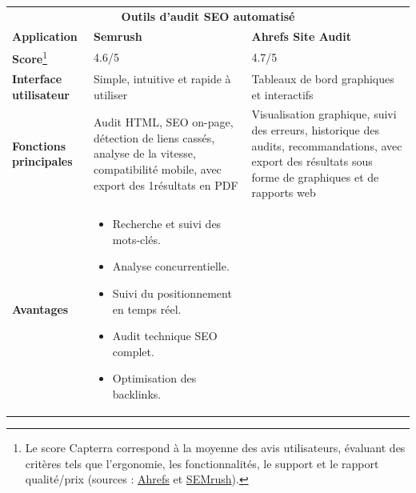 \begin{justify}
\begin{spacing}{1.5}
\begin{longtable}{|p{2.7cm}|p{6.6cm}|p{6.6cm}|}
\begin{minipage}[t]{6.6cm}
                                    \vspace{0.1cm}
                                \end{minipage} 
                                \\ 
                       \hline
                       \multicolumn{3}{|c|}{\textbf{Outils d’audit SEO automatisé\cite{seoTools}}} \\
                        \hline
                        \textbf{Application} & \textbf{Semrush}& \textbf{Ahrefs Site Audit} \\
                        \hline
                            \textbf{Score}\footnote{Le score Capterra correspond à la moyenne des avis utilisateurs, évaluant des critères tels que l’ergonomie, les fonctionnalités, le support et le rapport qualité/prix (sources : \href{https://www.capterra.com/p/176340/Ahrefs/}{Ahrefs} et \href{https://www.capterra.com/p/151962/SEMrush/}{SEMrush}).}
                            & 4.6/5& 4.7/5 \\ 
                        \hline 
                        \textbf{Interface utilisateur} & 
                        Simple, intuitive et rapide à utiliser & 
                        Tableaux de bord graphiques et interactifs \\
                        \hline   
                        \textbf{Fonctions principales} & 
                        Audit HTML, SEO on-page, détection de liens cassés, analyse de la vitesse, compatibilité mobile, avec export des 1résultats en PDF & Visualisation graphique, suivi des erreurs, historique des audits, recommandations, avec export des résultats sous forme de graphiques et de rapports web \\
                        \hline
                        \textbf{Avantages} & 
                       \begin{minipage}[t]{6.6cm}
                            \begin{itemize}[left=-0.15cm, label=\textcolor{green}{$\checkmark$}]
                               \item Recherche et suivi des mots-clés.
                               \item Analyse concurrentielle.
                               \item Suivi du positionnement en temps réel.
                               \item Audit technique SEO complet.
                               \item Optimisation des backlinks.

\end{itemize}
\end{minipage}
\end{longtable}
\end{spacing}
\end{justify}
